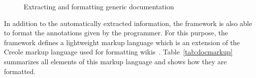 \begin{figure}
\caption{Extracting and formatting generic documentation}
\label{fig:docdataflow}
\end{figure}

In addition to the automatically extracted information, the framework is also able to format the annotations given by the programmer.
For this purpose, the framework defines a lightweight markup language which is an extension of the Creole markup language used for formatting wikis~\cite{sauer2007}.
Table~\ref{tab:docmarkup} summarizes all elements of this markup language and shows how they are formatted.

\markuptable

